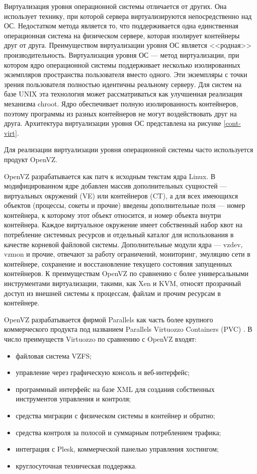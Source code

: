 Виртуализация уровня операционной системы отличается от других.
Она использует технику, при которой сервера виртуализируются непосредственно над ОС.
Недостатком метода является то, что поддерживается одна единственная операционная система на физическом сервере, которая изолирует контейнеры друг от друга.
Преимуществом виртуализации уровня ОС является <<родная>> производительность.
Виртуализация уровня ОС --- метод виртуализации, при котором ядро операционной системы поддерживает несколько изолированных экземпляров пространства пользователя вместо одного.
Эти экземпляры с точки зрения пользователя полностью идентичны реальному серверу.
Для систем на базе UNIX эта технология может рассматриваться как улучшенная реализация механизма chroot.
Ядро обеспечивает полную изолированность контейнеров, поэтому программы из разных контейнеров не могут воздействовать друг на друга.
Архитектура виртуализации уровня ОС представлена на рисунке \ref{cont-virt}.

Для реализации виртуализации уровня операционной системы часто используется продукт OpenVZ.

OpenVZ разрабатывается как патч к исходным текстам ядра Linux.
В модифицированном ядре добавлен массив дополнительных сущностей --- виртуальных окружений (VE) или контейнеров (CT), а для всех имеющихся объектов (процессы, сокеты и прочие) введены дополнительные поля --- номер контейнера, к которому этот объект относится, и номер объекта внутри контейнера.
Каждое виртуальное окружение имеет собственный набор квот на потребление системных ресурсов и отдельный каталог для использования в качестве корневой файловой системы.
Дополнительные модули ядра --- vzdev, vzmon и прочие, отвечают за работу ограничений, мониторинг, эмуляцию сети в контейнере, сохранение и восстановление текущего состояния запущенных контейнеров.
К преимуществам OpenVZ по сравнению с более универсальными инструментами виртуализации, такими, как Xen и KVM, относят прозрачный доступ из внешней системы к процессам, файлам и прочим ресурсам в контейнере.

OpenVZ разрабатывается фирмой Parallels как часть более крупного коммерческого продукта под названием Parallels Virtuozzo Containers (PVC) \cite{lxc-openvz}.
В число преимуществ Virtuozzo по сравнению с OpenVZ входят:
\begin{itemize}
  \item файловая система VZFS;
  \item управление через графическую консоль и веб-интерфейс;
  \item программный интерфейс на базе XML для создания собственных инструментов управления и контроля;
  \item средства миграции с физическом системы в контейнер и обратно;
  \item средства контроля за полосой и суммарным потреблением трафика;
  \item интеграция с Plesk, коммерческой панелью управления хостингом;
  \item круглосуточная техническая поддержка.
\end{itemize}

